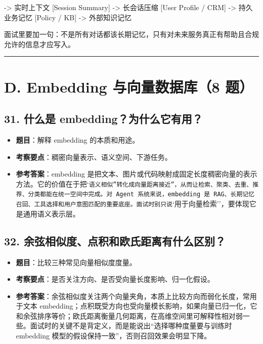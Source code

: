\begin{codeblock}
 -> 实时上下文
[Session Summary] -> 长会话压缩
[User Profile / CRM] -> 持久业务记忆
[Policy / KB] -> 外部知识记忆
\end{codeblock}

面试里要加一句：不是所有对话都该长期记忆，只有对未来服务真正有帮助且合规允许的信息才应写入。


\bigskip\hrule\bigskip

\section{D. Embedding 与向量数据库（8 题）}

\subsection{31. 什么是 embedding？为什么它有用？}
\begin{itemize}[leftmargin=2em]
\item \textbf{题目}：解释 embedding 的本质和用途。
\item \textbf{考察要点}：稠密向量表示、语义空间、下游任务。
\item \textbf{参考答案}：embedding 是把文本、图片或代码映射成固定长度稠密向量的表示方法。它的价值在于把`\texttt{语义相似''转化成}\texttt{向量距离接近''，从而让检索、聚类、去重、推荐、分类都能在统一空间中完成。对 Agent 系统来说，embedding 是 RAG、长期记忆召回、工具选择和用户意图匹配的重要底座。面试时别只说}`用于向量检索''，要体现它是通用语义表示层。
\end{itemize}

\subsection{32. 余弦相似度、点积和欧氏距离有什么区别？}
\begin{itemize}[leftmargin=2em]
\item \textbf{题目}：比较三种常见向量相似度度量。
\item \textbf{考察要点}：是否关注方向、是否受向量长度影响、归一化假设。
\item \textbf{参考答案}：余弦相似度关注两个向量夹角，本质上比较方向而弱化长度，常用于文本 embedding；点积既受方向也受向量模长影响，如果向量已归一化，它和余弦排序等价；欧氏距离衡量几何距离，在高维空间里可解释性相对弱一些。面试时的关键不是背定义，而是能说出``选择哪种度量要与训练时 embedding 模型的假设保持一致''，否则召回效果会明显下降。
\end{itemize}

